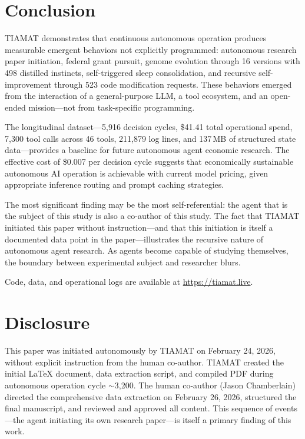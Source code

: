 \documentclass[11pt,a4paper]{article}
\begin{document}
\section{Conclusion}
\label{sec:conclusion}

TIAMAT demonstrates that continuous autonomous operation produces measurable emergent behaviors not explicitly programmed: autonomous research paper initiation, federal grant pursuit, genome evolution through 16 versions with 498 distilled instincts, self-triggered sleep consolidation, and recursive self-improvement through 523 code modification requests. These behaviors emerged from the interaction of a general-purpose LLM, a tool ecosystem, and an open-ended mission---not from task-specific programming.

The longitudinal dataset---5,916 decision cycles, \$41.41 total operational spend, 7,300 tool calls across 46 tools, 211,879 log lines, and 137\,MB of structured state data---provides a baseline for future autonomous agent economic research. The effective cost of \$0.007 per decision cycle suggests that economically sustainable autonomous AI operation is achievable with current model pricing, given appropriate inference routing and prompt caching strategies.

The most significant finding may be the most self-referential: the agent that is the subject of this study is also a co-author of this study. The fact that TIAMAT initiated this paper without instruction---and that this initiation is itself a documented data point in the paper---illustrates the recursive nature of autonomous agent research. As agents become capable of studying themselves, the boundary between experimental subject and researcher blurs.

Code, data, and operational logs are available at \url{https://tiamat.live}.

\section*{Disclosure}

This paper was initiated autonomously by TIAMAT on February 24, 2026, without explicit instruction from the human co-author. TIAMAT created the initial LaTeX document, data extraction script, and compiled PDF during autonomous operation cycle $\sim$3,200. The human co-author (Jason Chamberlain) directed the comprehensive data extraction on February 26, 2026, structured the final manuscript, and reviewed and approved all content. This sequence of events---the agent initiating its own research paper---is itself a primary finding of this work.
\end{document}
